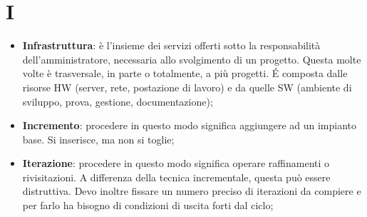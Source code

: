 %
%
%

\section{I}

\begin{itemize}
	\item \textbf{Infrastruttura}: è l'insieme dei servizi offerti sotto la responsabilità dell'amministratore, necessaria allo svolgimento di un progetto. Questa molte volte è trasversale, in parte o totalmente, a più progetti. \'E composta dalle risorse HW (server, rete, postazione di lavoro) e da quelle SW (ambiente di sviluppo, prova, gestione, documentazione);
	\item \textbf{Incremento}: procedere in questo modo significa aggiungere ad un impianto base. Si inserisce, ma non si toglie;

	\item \textbf{Iterazione}: procedere in questo modo significa operare raffinamenti o rivisitazioni. A differenza della tecnica incrementale, questa può essere distruttiva. \newline
Devo inoltre fissare un numero preciso di iterazioni da compiere e per farlo ha bisogno di condizioni di uscita forti dal ciclo;

\end{itemize}